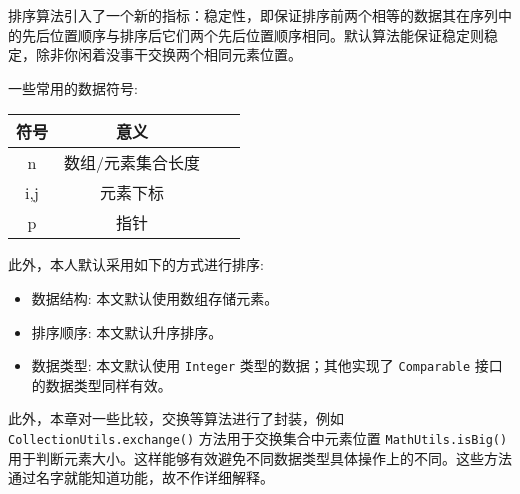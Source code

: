 排序算法引入了一个新的指标：稳定性，即保证排序前两个相等的数据其在序列中的先后位置顺序与排序后它们两个先后位置顺序相同。默认算法能保证稳定则稳定，除非你闲着没事干交换两个相同元素位置。

一些常用的数据符号:

\begin{table}[H]
    \centering
    \setlength{\tabcolsep}{4mm}
    \begin{tabular}{c|ccc}
        \toprule
        \textbf{符号} & \textbf{意义} \\
        \midrule
        n & 数组/元素集合长度 \\
        i,j & 元素下标 \\
        p & 指针 \\
        \bottomrule
    \end{tabular}
\end{table}

此外，本人默认采用如下的方式进行排序:
\begin{itemize}
    \item 数据结构: 本文默认使用数组存储元素。
    \item 排序顺序: 本文默认升序排序。
    \item 数据类型: 本文默认使用 \texttt{Integer} 类型的数据；其他实现了 \texttt{Comparable} 接口的数据类型同样有效。
\end{itemize}

此外，本章对一些比较，交换等算法进行了封装，例如 \texttt{CollectionUtils.exchange()} 方法用于交换集合中元素位置 \texttt{MathUtils.isBig()} 用于判断元素大小。这样能够有效避免不同数据类型具体操作上的不同。这些方法通过名字就能知道功能，故不作详细解释。
